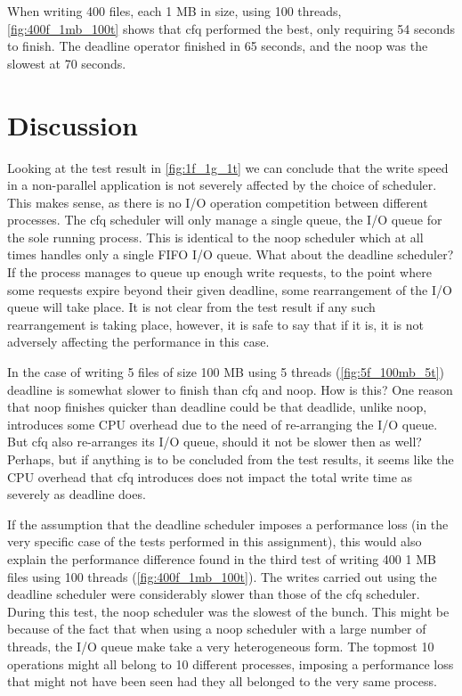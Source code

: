 \documentclass[10pt, titlepage, oneside, a4paper]{article}
\begin{document}
        When writing 400 files, each 1 MB in size, using 100 threads, \ref{fig:400f_1mb_100t} shows that cfq performed the best, only requiring 54 seconds to finish. The deadline operator finished in 65 seconds, and the noop was the slowest at 70 seconds.
        
        \section{Discussion}
        
        Looking at the test result in \ref{fig:1f_1g_1t} we can conclude that the write speed in a non-parallel application is not severely affected by the choice of scheduler. This makes sense, as there is no I/O operation competition between different processes. The cfq scheduler will only manage a single queue, the I/O queue for the sole running process. This is identical to the noop scheduler which at all times handles only a single FIFO I/O queue. What about the deadline scheduler? If the process manages to queue up enough write requests, to the point where some requests expire beyond their given deadline, some rearrangement of the I/O queue will take place. It is not clear from the test result if any such rearrangement is taking place, however, it is safe to say that if it is, it is not adversely affecting the performance in this case.
        
        In the case of writing 5 files of size 100 MB using 5 threads (\ref{fig:5f_100mb_5t}) deadline is somewhat slower to finish than cfq and noop. How is this? One reason that noop finishes quicker than deadline could be that deadlide, unlike noop, introduces some CPU overhead due to the need of re-arranging the I/O queue. But cfq also re-arranges its I/O queue, should it not be slower then as well? Perhaps, but if anything is to be concluded from the test results, it seems like the CPU overhead that cfq introduces does not impact the total write time as severely as deadline does.
        
        If the assumption that the deadline scheduler imposes a performance loss (in the very specific case of the tests performed in this assignment), this would also explain the performance difference found in the third test of writing 400 1 MB files using 100 threads (\ref{fig:400f_1mb_100t}). The writes carried out using the deadline scheduler were considerably slower than those of the cfq scheduler. During this test, the noop scheduler was the slowest of the bunch. This might be because of the fact that when using a noop scheduler with a large number of threads, the I/O queue make take a very heterogeneous form. The topmost 10 operations might all belong to 10 different processes, imposing a performance loss that might not have been seen had they all belonged to the very same process.
        
\end{document}
